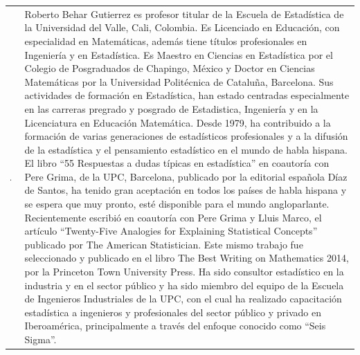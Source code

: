 \begin{table}[H]
\centering
\begin{tabular}{m{}  m{}}
\begin{center} 
\includegraphics[width=0.2\textwidth]{./fotos/gutierrez} \end{center} & 
\noindent \small{Roberto Behar Gutierrez es profesor titular de la Escuela de Estadística de la Universidad del Valle, Cali, Colombia. Es Licenciado en Educación, con especialidad en Matemáticas, además tiene títulos profesionales en Ingeniería y en Estadística. Es Maestro en Ciencias en Estadística por el Colegio de Posgraduados de Chapingo, México y Doctor en Ciencias Matemáticas por la Universidad Politécnica de Cataluña, Barcelona. Sus actividades de formación en Estadística, han estado centradas especialmente en las carreras pregrado y posgrado de Estadistica, Ingeniería y en la Licenciatura en Educación Matemática. Desde 1979, ha contribuido a la formación de varias generaciones de estadísticos profesionales y a la difusión de la estadística y el pensamiento estadístico en el mundo de habla hispana. El libro “55 Respuestas a dudas típicas en estadística” en coautoría con Pere Grima, de la UPC, Barcelona, publicado por la editorial española Díaz de Santos, ha tenido gran aceptación en todos los países de habla hispana y se espera que muy pronto, esté disponible para el mundo angloparlante. Recientemente escribió en coautoría con Pere Grima y Lluis Marco, el artículo “Twenty-Five Analogies for Explaining Statistical Concepts” publicado por The American Statistician. Este mismo trabajo fue seleccionado y publicado en el libro The Best Writing on Mathematics 2014, por la Princeton Town University Press. Ha sido consultor estadístico en la industria y en el sector público y ha sido miembro del equipo de la Escuela de Ingenieros Industriales de la UPC, con el
cual ha realizado capacitación estadística a ingenieros y profesionales del sector público y privado en Iberoamérica, principalmente a través del enfoque conocido como “Seis Sigma”.} \\
\end{tabular}
\end{table}




